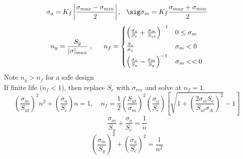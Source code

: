 \vspace{-10pt}
\begin{align*}
    \sigma_a =K_f\left|\frac{\sigma_{max}-\sigma_{min}}{2}\right|,\hspace{7pt}  \sig\vspace{-3pt}\sigma_m =K_f\frac{\sigma_{max}+\sigma_{min}}{2}
\end{align*}
\vspace{-16pt}
        \[n_y=\frac{S_y}{|\sigma|_{max}}\ ,\hspace{15pt}n_f =\begin{cases} 
              \left(\frac{\sigma_a}{S_e}+\frac{\sigma_m}{S_{ut}}\right)^{-1} &  0\leq \sigma_m \vspace{4pt}\\
            \frac{S_e}{\sigma_a} &\sigma_m<0\vspace{4pt}\\ \left(\frac{\sigma_a}{S_y}-\frac{\sigma_m}{S_{y}}\right)^{-1}&\sigma_m << 0
           \end{cases}\]
Note $n_y > n_f$ for a safe design\\
If finite life ($n_f<1$), then replace $S_e$ with $\sigma_{rev}$ and solve at $n_f=1$. \\
\vspace{-13pt}
\begin{equation*}
    \left(\frac{\sigma_m}{S_{ut}}\right)^2n^2+\left(\frac{\sigma_a}{S_e}\right)n=1,\ \hspace{10pt} n_f=\frac{1}{2}\left(\frac{S_{ut}}{\sigma_m}\right)^2\left(\frac{\sigma_a}{S_e}\right)\left[\sqrt{1+\left(\frac{2\sigma_mS_e}{S_{ut}\sigma_A}\right)^2}-1\right]
\end{equation*}
\vspace{-10pt}
\begin{equation*}
    \frac{\sigma_m}{S_y}+\frac{\sigma_a}{S_e}=\frac{1}{n}
\end{equation*}
\vspace{-10pt}
\begin{equation*}
    \left(\frac{\sigma_m}{S_{y}}\right)^2+\left(\frac{\sigma_a}{S_e}\right)^2=\frac{1}{n^2}
\end{equation*}